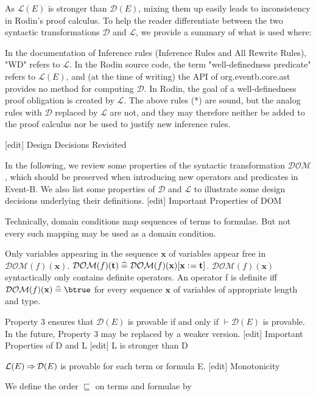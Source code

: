 As $\mathcal{L}(E)$ is stronger than $\mathcal{D}(E)$, mixing them up easily leads to inconsistency in Rodin's proof calculus. To help the reader differentiate between the two syntactic transformations $\mathcal{D}$ and $\mathcal{L}$, we provide a summary of what is used where:

    In the documentation of Inference rules (Inference Rules and All Rewrite Rules), "WD" refers to $\mathcal{L}$.
    In the Rodin source code, the term "well-definedness predicate" refers to $\mathcal{L}(E)$, and (at the time of writing) the API of org.eventb.core.ast provides no method for computing $\mathcal{D}$.
    In Rodin, the goal of a well-definedness proof obligation is created by $\mathcal{L}$.
    The above rules (*) are sound, but the analog rules with $\mathcal{D}$ replaced by $\mathcal{L}$ are not, and they may therefore neither be added to the proof calculus nor be used to justify new inference rules. 

[edit] Design Decisions Revisited

In the following, we review some properties of the syntactic transformation $\mathcal{DOM}$, which should be preserved when introducing new operators and predicates in Event-B. We also list some properties of $\mathcal{D}$ and $\mathcal{L}$ to illustrate some design decisions underlying their definitions.
[edit] Important Properties of DOM

Technically, domain conditions map sequences of terms to formulae. But not every such mapping may be used as a domain condition.

    Only variables appearing in the sequence $\mathbf{x}$ of variables appear free in $\mathcal{DOM}(f)(\mathbf{x})$.
    $\mathcal{DOM}(f)(\mathbf{t}) \mathrel{\widehat=} \mathcal{DOM}(f)(\mathbf{x})[\mathbf{x}\mathrel{:\mkern1mu=}\mathbf{t}]$.
    $\mathcal{DOM}(f)(\mathbf{x})$ syntactically only contains definite operators. An operator f is definite iff $\mathcal{DOM}(f)(\mathbf{x})\defi\btrue$ for every sequence $\mathbf{x}$ of variables of appropriate length and type. 

Property 3 ensures that $\mathcal{D}(E)$ is provable if and only if $\vdash\mathcal{D}(E)$ is provable. In the future, Property 3 may be replaced by a weaker version.
[edit] Important Properties of D and L
[edit] L is stronger than D

$\mathcal{L}(E) \mathbin\Rightarrow \mathcal{D}(E)$ is provable for each term or formula E.
[edit] Monotonicity

We define the order $\sqsubseteq$ on terms and formulae by

